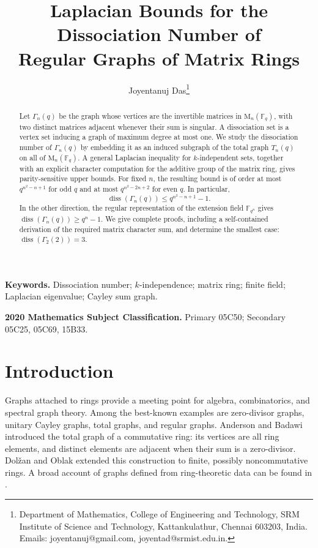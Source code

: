 \documentclass[11pt]{article}
\title{Laplacian Bounds for the Dissociation Number of\\
Regular Graphs of Matrix Rings}
\author{Joyentanuj Das\footnote{Department of Mathematics, College of Engineering and Technology, SRM Institute of Science and Technology, Kattankulathur, Chennai 603203, India. Emails: joyentanuj@gmail.com, joyentad@srmist.edu.in.}}
\date{}
\theoremstyle{definition}
\DeclareMathOperator{\diss}{diss}
\newcommand{\F}{\mathbb{F}}
\newcommand{\Mat}{\mathrm{M}}
\begin{document}
\maketitle

\begin{abstract}
Let $\Gamma_n(q)$ be the graph whose vertices are the invertible matrices in $\Mat_n(\F_q)$, with two distinct matrices adjacent whenever their sum is singular.  A dissociation set is a vertex set inducing a graph of maximum degree at most one.  We study the dissociation number of $\Gamma_n(q)$ by embedding it as an induced subgraph of the total graph $T_n(q)$ on all of $\Mat_n(\F_q)$.  A general Laplacian inequality for $k$-independent sets, together with an explicit character computation for the additive group of the matrix ring, gives parity-sensitive upper bounds.  For fixed $n$, the resulting bound is of order at most $q^{n^2-n+1}$ for odd $q$ and at most $q^{n^2-2n+2}$ for even $q$.  In particular,
\[
  \diss(\Gamma_n(q))\le q^{n^2-n+1}-1.
\]
In the other direction, the regular representation of the extension field
$\F_{q^n}$ gives $\diss(\Gamma_n(q))\ge q^n-1$.  We give complete proofs,
including a self-contained derivation of the required matrix character sum,
and determine the smallest case: $\diss(\Gamma_2(2))=3$.
\end{abstract}

\noindent\textbf{Keywords.}
Dissociation number; $k$-independence; matrix ring; finite field; Laplacian eigenvalue; Cayley sum graph.

\medskip
\noindent\textbf{2020 Mathematics Subject Classification.}
Primary 05C50; Secondary 05C25, 05C69, 15B33.

\section{Introduction}

Graphs attached to rings provide a meeting point for algebra, combinatorics,
and spectral graph theory.  Among the best-known examples are zero-divisor
graphs, unitary Cayley graphs, total graphs, and regular graphs.  Anderson and
Badawi \cite{anderson-badawi} introduced the total graph of a commutative
ring: its vertices are all ring elements, and distinct elements are adjacent
when their sum is a zero-divisor.  Dol\v{z}an and Oblak
\cite{dolzan-oblak} extended this construction to finite, possibly
noncommutative rings.  A broad account of graphs defined from ring-theoretic
data can be found in \cite{anderson-book}.
\end{document}

